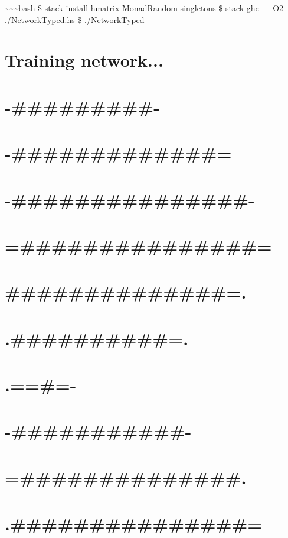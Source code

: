 \documentclass[]{article}
\begin{document}
\textasciitilde{}\textasciitilde{}\textasciitilde{}bash \$ stack install hmatrix
MonadRandom singletons \$ stack ghc -\/- -O2 ./NetworkTyped.hs \$ ./NetworkTyped

\section{Training network...}

\section{-\#\#\#\#\#\#\#\#\#-}

\section{-\#\#\#\#\#\#\#\#\#\#\#\#\#=}

\section{-\#\#\#\#\#\#\#\#\#\#\#\#\#\#\#-}

\section{=\#\#\#\#\#\#\#\#\#\#\#\#\#\#\#=}

\section{\#\#\#\#\#\#\#\#\#\#\#\#\#\#=.}

\section{.\#\#\#\#\#\#\#\#\#\#=.}

\section{.==\#=-}

\section{-\#\#\#\#\#\#\#\#\#\#\#-}

\section{=\#\#\#\#\#\#\#\#\#\#\#\#\#\#.}

\section{.\#\#\#\#\#\#\#\#\#\#\#\#\#\#\#=}
\end{document}
